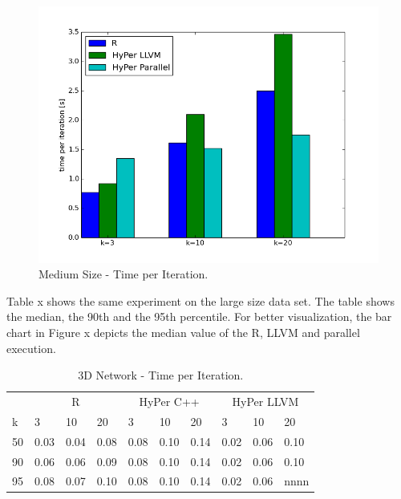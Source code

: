 \begin{figure}[htsb]
  \centering
  \includegraphics[scale=0.4, trim="0cm 1.5cm 0cm 0cm"]{figures/charts/final_15M}
  \caption[Medium Size - Time per Iteration]{Medium Size - Time per Iteration.}
  \label{fig:final_15M}
\end{figure}

Table x shows the same experiment on the large size data set. The table shows the median, the 90th and the 95th percentile. For better visualization, the bar chart in Figure x depicts the median value of the R, LLVM and parallel execution. 

\begin{table}[htsb]
  \caption[3D Network - Time per Iteration]{3D Network - Time per Iteration.}
  \label{tab:network_all}
  \centering
  \begin{tabular}{l l l l l l l l l l }
    \toprule
      & \multicolumn{3}{c}{R} & \multicolumn{3}{c}{HyPer C++} & \multicolumn{3}{c}{HyPer LLVM}  \\
      k & 3 & 10 & 20 & 3 & 10 & 20 & 3 & 10 & 20 \\
    \midrule
      50  & 0.03 & 0.04 & 0.08 & 0.08 & 0.10 & 0.14 & 0.02 & 0.06 & 0.10 \\
      90  & 0.06 & 0.06 & 0.09 & 0.08 & 0.10 & 0.14 & 0.02 & 0.06 & 0.10 \\
      95  & 0.08 & 0.07 & 0.10 & 0.08 & 0.10 & 0.14 & 0.02 & 0.06 & nnnn \\
    \bottomrule
  \end{tabular}
\end{table}


